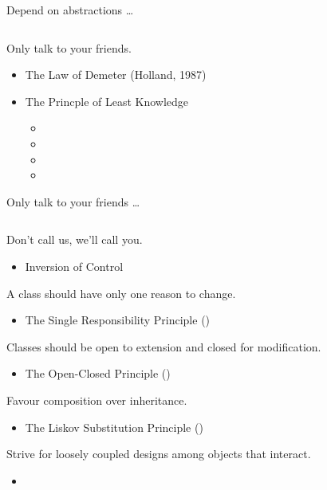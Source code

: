 \documentclass{beamer}
\begin{document}
\begin{frame}{Depend on abstractions \ldots}
    \vspace{0cm}
    \begin{columns}
        \column{\dimexpr\paperwidth-40pt}
        
    \end{columns}
\end{frame}

\begin{frame}{Only talk to your friends.}
    \begin{itemize}
        \item The Law of Demeter (Holland, 1987)
        \item The Princple of Least Knowledge
        \begin{itemize}
            \item
            \item
            \item
            \item
        \end{itemize}
    \end{itemize}
\end{frame}

\begin{frame}{Only talk to your friends \ldots}
    \vspace{0cm}
    \begin{columns}
        \column{\dimexpr\paperwidth-40pt}
        
    \end{columns}
\end{frame}

\begin{frame}{Don't call us, we'll call you.}
    \begin{itemize}
        \item Inversion of Control
    \end{itemize}
\end{frame}

\begin{frame}{A class should have only one reason to change.}
    \begin{itemize}
        \item The Single Responsibility Principle ()
    \end{itemize}
\end{frame}

\begin{frame}{Classes should be open to extension and closed for modification.}
    \begin{itemize}
        \item The Open-Closed Principle ()
    \end{itemize}
\end{frame}

\begin{frame}{Favour composition over inheritance.}
    \begin{itemize}
        \item The Liskov Substitution Principle ()
    \end{itemize}
\end{frame}

\begin{frame}{Strive for loosely coupled designs among objects that interact.}
    \begin{itemize}
        \item
    \end{itemize}
\end{frame}
\end{document}
